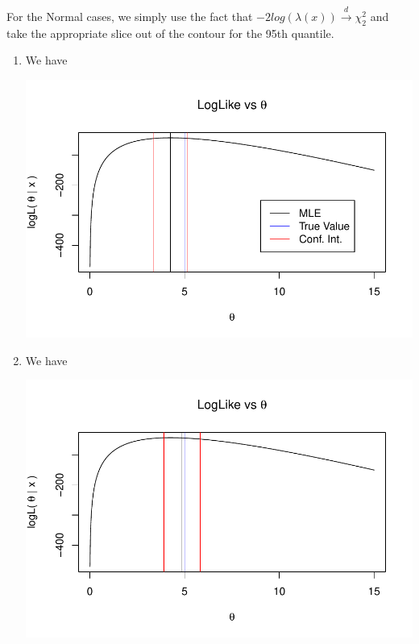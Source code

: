 \documentclass[12pt]{article}\usepackage[]{graphicx}\usepackage[]{color}
\makeatletter
\def\maxwidth{ %
  \ifdim\Gin@nat@width>\linewidth
    \linewidth
  \else
    \Gin@nat@width
  \fi
}
\newenvironment{knitrout}{}{} %
\makeatother
\begin{document}
\begin{enumerate}
For the Normal cases, we simply use the fact that $-2log(\lambda(x)) \overset{d}{\rightarrow} \chi^2_2$ and take the appropriate slice out of the contour for the 95th quantile.
\begin{enumerate}[label = (\alph*)]
\item We have 
\begin{knitrout}
\color{fgcolor}

{\centering \includegraphics[width=\maxwidth]{figure/plot10a-1} 

}



\end{knitrout}
\item We have
\begin{knitrout}
\color{fgcolor}

{\centering \includegraphics[width=\maxwidth]{figure/plot10b-1} 

}
\end{knitrout}
\end{enumerate}
\end{enumerate}
\end{document}

